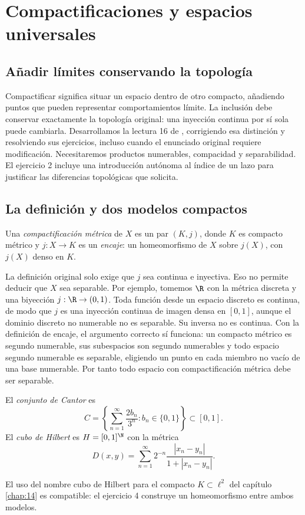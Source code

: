 \chapter{Compactificaciones y espacios universales}\label{chap:16}

\section{Añadir límites conservando la topología}
Compactificar significa situar un espacio dentro de otro compacto, añadiendo puntos que pueden representar comportamientos límite. La inclusión debe conservar exactamente la topología original: una inyección continua por sí sola puede cambiarla. Desarrollamos la lectura 16 de \cite{valencia}, corrigiendo esa distinción y resolviendo sus ejercicios, incluso cuando el enunciado original requiere modificación. Necesitaremos productos numerables, compacidad y separabilidad. El ejercicio 2 incluye una introducción autónoma al índice de un lazo para justificar las diferencias topológicas que solicita.

\section{La definición y dos modelos compactos}
\begin{definicion}
Una \emph{compactificación métrica} de $X$ es un par $(K,j)$, donde $K$ es compacto métrico y $j:X\to K$ es un \emph{encaje}: un homeomorfismo de $X$ sobre $j(X)$, con $j(X)$ denso en $K$.
\end{definicion}
\begin{observacion}
La definición original solo exige que $j$ sea continua e inyectiva. Eso no permite deducir que $X$ sea separable. Por ejemplo, tomemos $\R$ con la métrica discreta y una biyección $j:\R\to(0,1)$. Toda función desde un espacio discreto es continua, de modo que $j$ es una inyección continua de imagen densa en $[0,1]$, aunque el dominio discreto no numerable no es separable. Su inversa no es continua. Con la definición de encaje, el argumento correcto sí funciona: un compacto métrico es segundo numerable, sus subespacios son segundo numerables y todo espacio segundo numerable es separable, eligiendo un punto en cada miembro no vacío de una base numerable. Por tanto todo espacio con compactificación métrica debe ser separable.
\end{observacion}

\begin{definicion}
El \emph{conjunto de Cantor} es
\[
C=\left\{\sum_{n=1}^\infty\frac{2b_n}{3^n}:b_n\in\{0,1\}\right\}\subset[0,1].
\]
El \emph{cubo de Hilbert} es $H=[0,1]^{\N}$ con la métrica
\[
D(x,y)=\sum_{n=1}^\infty2^{-n}\frac{|x_n-y_n|}{1+|x_n-y_n|}.
\]
\end{definicion}
El uso del nombre cubo de Hilbert para el compacto $K\subset\ell^2$ del capítulo \ref{chap:14} es compatible: el ejercicio 4 construye un homeomorfismo entre ambos modelos.

